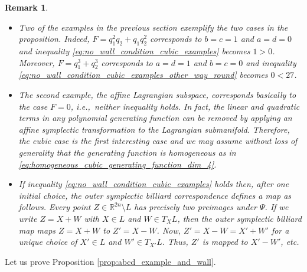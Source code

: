 \documentclass[12pt]{article}
\newtheorem{remark}[lemma]{Remark}
\newcommand{\R}{{\mathbb R}}
\begin{document}
\begin{remark}$ $
{\rm
\begin{itemize}  %
\item Two of the examples in the previous section exemplify the two cases in the proposition. Indeed, $F=q_1^2q_2+q_1q_2^2$ corresponds to $b=c=1$ and $a=d=0$ and inequality \eqref{eq:no_wall_condition_cubic_examples} becomes $1>0$. Moreover, $F=q_1^3+q_2^3$ corresponds to $a=d=1$ and $b=c=0$ and inequality \eqref{eq:no_wall_condition_cubic_examples_other_way_round} becomes $0<27$. 
\item The second example, the affine Lagrangian subspace, corresponds basically to the case $F=0$, i.e.,~neither inequality holds. In fact, the linear and quadratic terms in any polynomial generating function can be removed by applying an affine symplectic transformation to the Lagrangian submanifold. Therefore, the cubic case is the first interesting case and we may assume without loss of generality that the generating function is homogeneous as in \eqref{eq:homogeneous_cubic_generating_function_dim_4}. 

\item If inequality \eqref{eq:no_wall_condition_cubic_examples} holds then, after one initial choice, the outer symplectic billiard correspondence defines a map as follows. Every point $Z\in\R^{2n}\setminus L$ has precisely two preimages under $\Psi$. If we  write $Z=X+W$ with $X\in L$ and $W\in T_{X}L$, then the outer symplectic billiard map maps $Z=X+W$ to $Z'=X-W$. Now, $Z'=X-W=X'+W'$ for a unique choice of $X'\in L$ and $W'\in T_{X'}L$. Thus, $Z'$ is mapped to $X'-W'$, etc.

\end{itemize}
} 
\end{remark}

Let us prove Proposition \ref{prop:abcd_example_and_wall}.
\end{document}
